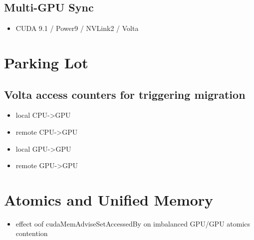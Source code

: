 \subsection{Multi-GPU Sync}
\begin{itemize}
    \item CUDA 9.1 / Power9 / NVLink2 / Volta
\end{itemize}


\section{Parking Lot}
\subsection{Volta access counters for triggering migration}
\begin{itemize}
    \item local CPU->GPU
    \item remote CPU->GPU
    \item local GPU->GPU
    \item remote GPU->GPU
\end{itemize}


\section{Atomics and Unified Memory}
\begin{itemize}
    \item effect oof cudaMemAdviseSetAccessedBy on imbalanced GPU/GPU atomics contention
\end{itemize}